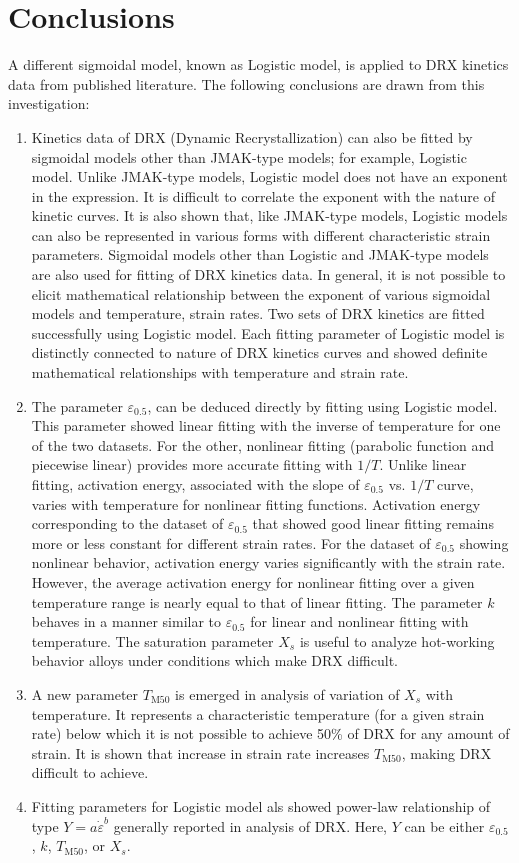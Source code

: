 \documentclass[a4paper, 11pt, dvipsnames]{article}
\begin{document}
\section{Conclusions}
A different sigmoidal model, known as Logistic model, is applied to DRX kinetics data from published literature. The following conclusions are drawn from this investigation:
\begin{enumerate}
\item Kinetics data of DRX (Dynamic Recrystallization) can also be fitted by sigmoidal models other than JMAK-type models; for example, Logistic model. Unlike {\small JMAK}-type models, Logistic model does not have an exponent in the expression. It is difficult to correlate the exponent with the nature of kinetic curves. It is also shown that, like {\small JMAK}-type models, Logistic models can also be represented in various forms with different characteristic strain parameters. Sigmoidal models other than Logistic and {\small JMAK}-type models are also used for fitting of DRX kinetics data. In general, it is not possible to elicit mathematical relationship between the exponent of various sigmoidal models and temperature, strain rates. Two sets of DRX kinetics are fitted successfully using Logistic model. Each fitting parameter of Logistic model is distinctly connected to nature of DRX kinetics curves and showed definite mathematical relationships with temperature and strain rate.  
\item The parameter $\varepsilon_{0.5}$, can be deduced directly by fitting using Logistic model. This parameter showed linear fitting with the inverse of temperature for one of the two datasets. For the other, nonlinear fitting (parabolic function and piecewise linear) provides more accurate fitting with $1/T$. Unlike linear fitting, activation energy, associated with the slope of $\varepsilon_{0.5}$ vs. $1/T$ curve, varies with temperature for nonlinear fitting functions. Activation energy corresponding to the dataset of $\varepsilon_{0.5}$ that showed good linear fitting remains more or less constant for different strain rates. For the dataset of $\varepsilon_{0.5}$ showing nonlinear behavior, activation energy varies significantly with the strain rate. However, the average activation energy for nonlinear fitting over a given temperature range is nearly equal to that of linear fitting. The parameter $k$ behaves in a manner similar to $\varepsilon_{0.5}$ for linear and nonlinear fitting with temperature. The saturation parameter $X_s$ is useful to analyze hot-working behavior alloys under conditions which make DRX difficult.
\item A new parameter $T_{\text{M50}}$ is emerged in analysis of variation of $X_s$ with temperature. It represents a characteristic temperature (for a given strain rate) below which it is not possible to achieve 50\% of DRX for any amount of strain. It is shown that increase in strain rate increases $T_{\text{M50}}$, making DRX difficult to achieve. 
\item Fitting parameters for Logistic model als showed power-law relationship of type $ Y = a\dot{\varepsilon}^b$ generally reported in analysis of DRX. Here, $Y$ can be either $\varepsilon_{0.5}$, $k$, $T_{\text{M50}}$, or $X_s$. 
\end{enumerate}
\end{document}

